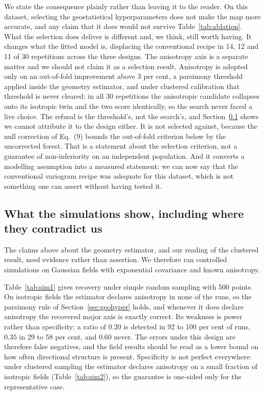 \documentclass[preprint,12pt,authoryear]{elsarticle}
\begin{document}
We state the consequence plainly rather than leaving it to the reader. On this
dataset, selecting the geostatistical hyperparameters does not make the map more
accurate, and any claim that it does would not survive Table~\ref{tab:ablation}.
What the selection does deliver is different and, we think, still worth having.
It changes what the fitted model is, displacing the conventional recipe in 14,
12 and 11 of 30 repetitions across the three designs. The anisotropy axis is a
separate matter and we should not claim it as a selection result. Anisotropy is
adopted only on an out-of-fold improvement above 3 per cent, a parsimony
threshold applied inside the geometry estimator, and under clustered calibration
that threshold is never cleared: in all 30 repetitions the anisotropic candidate
collapses onto its isotropic twin and the two score identically, so the search
never faced a live choice. The refusal is the threshold's, not the search's, and
Section~\ref{sec:sims} shows we cannot attribute it to the design either. It is not selected against, because the
null correction of Eq.~(9) bounds the out-of-fold criterion below by the
uncorrected forest. That is a statement about the selection criterion, not a
guarantee of non-inferiority on an independent population. And
it converts a modelling assumption into a measured statement: we can now say
that the conventional variogram recipe was adequate for this dataset, which is
not something one can assert without having tested it.

\subsection{What the simulations show, including where they contradict us}
\label{sec:sims}

The claims above about the geometry estimator, and our reading of the clustered
result, need evidence rather than assertion. We therefore ran controlled
simulations on Gaussian fields with exponential covariance and known anisotropy.

Table~\ref{tab:sim1} gives recovery under simple random sampling with 500
points. On isotropic fields the estimator declares anisotropy in none of the
runs, so the parsimony rule of Section~\ref{sec:geohyper} holds, and whenever it
does declare anisotropy the recovered major axis is exactly correct. Its
weakness is power rather than specificity: a ratio of $0.20$ is detected in 92
to 100 per cent of runs, $0.35$ in 29 to 58 per cent, and $0.60$ never. The
errors under this design are therefore false negatives, and the field results
should be read as a lower bound on how often directional structure is present.
Specificity is not perfect everywhere: under clustered sampling the estimator
declares anisotropy on a small fraction of isotropic fields
(Table~\ref{tab:sim2}), so the guarantee is one-sided only for the
representative case.
\end{document}
